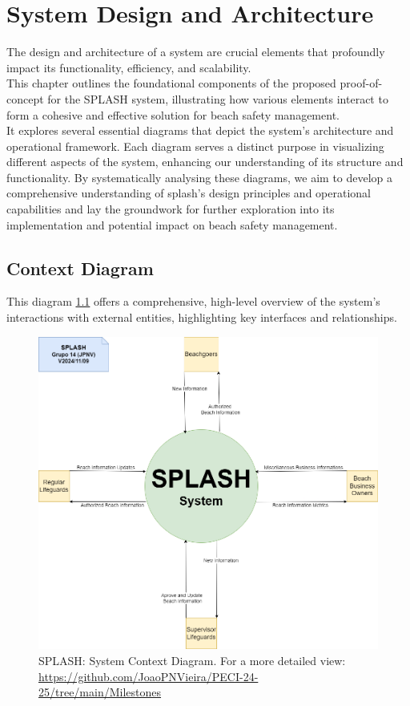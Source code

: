 \chapter{System Design and Architecture}
\label{chapter:architecture}

The design and architecture of a system are crucial elements that profoundly impact its functionality, efficiency, and scalability. 
\\
This chapter outlines the foundational components of the proposed proof-of-concept for the SPLASH system, illustrating how various elements interact to form a cohesive and effective solution for beach safety management. 
\\ 
It explores several essential diagrams that depict the system's architecture and operational framework. Each diagram serves a distinct purpose in visualizing different aspects of the system, enhancing our understanding of its structure and functionality. By systematically analysing these diagrams, we aim to develop a comprehensive understanding of \ac{splash}'s design principles and operational capabilities and lay the groundwork for further exploration into its implementation and potential impact on beach safety management.
\\

\newpage
\section{Context Diagram}
\label{section:context_diag}
This diagram \ref{fig:context_diag} offers a comprehensive, high-level overview of the system's interactions with external entities, highlighting key interfaces and relationships.

\begin{figure}[H]
      \centering
      \includegraphics[width=16cm]{figs/context_diagram.png}
      \caption{SPLASH: System Context Diagram. For a more detailed view: \url{https://github.com/JoaoPNVieira/PECI-24-25/tree/main/Milestones}}
      \label{fig:context_diag}
\end{figure}

